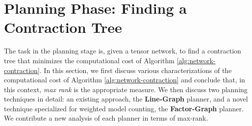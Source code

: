 \section{Planning Phase: Finding a Contraction Tree}
\label{sec:tensors:planning}
The task in the planning stage is, given a tensor network, to find a contraction tree that minimizes the computational cost of Algorithm \ref{alg:network-contraction}.
In this section, we first discuss various characterizations of the computational cost of Algorithm \ref{alg:network-contraction} and conclude that, in this context, \emph{max rank} is the appropriate measure.
We then discuss two planning techniques in detail: an existing approach, the \textbf{Line-Graph} planner, and a novel technique specialized for weighted model counting, the \textbf{Factor-Graph} planner. We contribute a new analysis of each planner in terms of max-rank.







